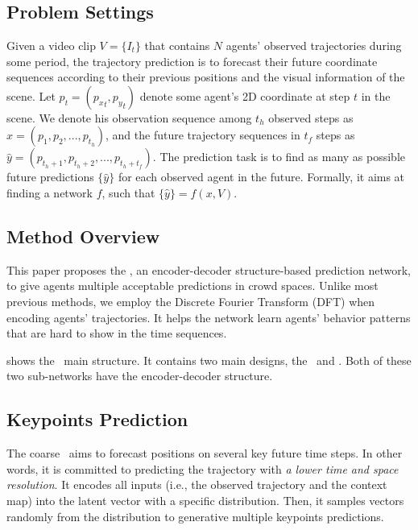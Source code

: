 \documentclass[../paper.tex]{subfiles}
\begin{document}
    
\section{\MODEL}

\subsection{Problem Settings}

Given a video clip $V = \{I_t\}$ that contains $N$ agents' observed trajectories during some period, the trajectory prediction is to forecast their future coordinate sequences according to their previous positions and the visual information of the scene.
Let $p_t = ({p_x}_t, {p_y}_t)$ denote some agent's 2D coordinate at step $t$ in the scene.
We denote his observation sequence among $t_h$ observed steps as $x = (p_1, p_2, ..., p_{t_h})$, and the future trajectory sequences in $t_f$ steps as $\hat{y} = (p_{t_h + 1}, p_{t_h + 2}, ..., p_{t_h + t_f})$.
The prediction task is to find as many as possible future predictions $\{\hat{y}\}$ for each observed agent in the future.
Formally, it aims at finding a network $f$, such that $\{\hat{y}\} = f(x, V)$.

\subsection{Method Overview}



This paper proposes the \MODEL, an encoder-decoder structure-based prediction network, to give agents multiple acceptable predictions in crowd spaces.
Unlike most previous methods, we employ the Discrete Fourier Transform (DFT) when encoding agents' trajectories.
It helps the network learn agents' behavior patterns that are hard to show in the time sequences.

 shows the \MODEL~main structure.
It contains two main designs, the \ALPHAMODEL~and \BETAMODEL.
Both of these two sub-networks have the encoder-decoder structure.

\subsection{Keypoints Prediction}

The coarse \ALPHAMODEL~aims to forecast positions on several key future time steps.
In other words, it is committed to predicting the trajectory with \emph{a lower time and space resolution}.
It encodes all inputs (i.e., the observed trajectory and the context map) into the latent vector with a specific distribution.
Then, it samples vectors randomly from the distribution to generative multiple keypoints predictions.
\end{document}
